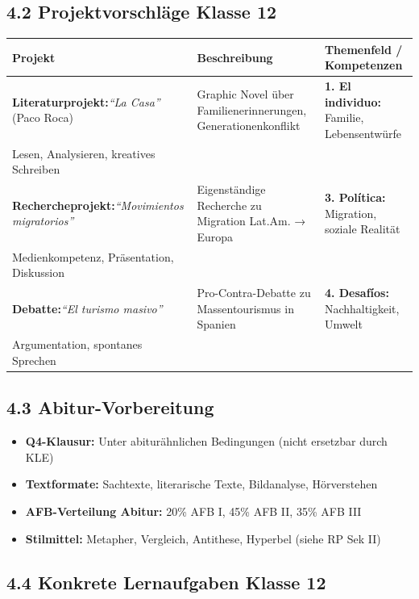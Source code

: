 \documentclass[11pt, a4paper]{article}
\newcommand{\es}[1]{\textit{#1}}
\begin{document}
\subsection*{4.2 Projektvorschläge Klasse 12}

\begin{tabularx}{\textwidth}{|L{3cm}|L{4.5cm}|X|}
\hline
{}
\textbf{Projekt} & \textbf{Beschreibung} & \textbf{Themenfeld / Kompetenzen} \\
\hline
\textbf{Literaturprojekt:}\newline \es{``La Casa''} (Paco Roca) &
Graphic Novel über Familienerinnerungen, Generationenkonflikt &
\textbf{1. El individuo:} Familie, Lebensentwürfe\\
Lesen, Analysieren, kreatives Schreiben \\
\hline
\textbf{Rechercheprojekt:}\newline \es{``Movimientos migratorios''} &
Eigenständige Recherche zu Migration Lat.Am. → Europa &
\textbf{3. Política:} Migration, soziale Realität\\
Medienkompetenz, Präsentation, Diskussion \\
\hline
\textbf{Debatte:}\newline \es{``El turismo masivo''} &
Pro-Contra-Debatte zu Massentourismus in Spanien &
\textbf{4. Desafíos:} Nachhaltigkeit, Umwelt\\
Argumentation, spontanes Sprechen \\
\hline
\end{tabularx}

\subsection*{4.3 Abitur-Vorbereitung}

\begin{itemize}[leftmargin=1.5em]
    \item \textbf{Q4-Klausur:} Unter abiturähnlichen Bedingungen (nicht ersetzbar durch KLE)
    \item \textbf{Textformate:} Sachtexte, literarische Texte, Bildanalyse, Hörverstehen
    \item \textbf{AFB-Verteilung Abitur:} 20\% AFB I, 45\% AFB II, 35\% AFB III
    \item \textbf{Stilmittel:} Metapher, Vergleich, Antithese, Hyperbel (siehe RP Sek II)
\end{itemize}

\subsection*{4.4 Konkrete Lernaufgaben Klasse 12}
\end{document}
